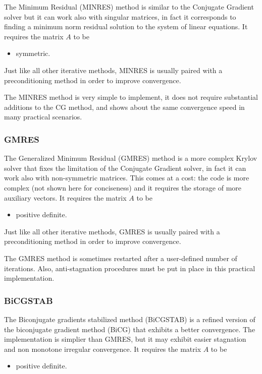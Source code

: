 \documentclass{digitaldynamics}
\def\matr#1{{#1}}
\begin{document}
The Minimum Residual (MINRES) method is similar to the Conjugate Gradient solver but it can work also with singular matrices, in fact it corresponds to finding a minimum norm residual solution to the system of linear equations.
It requires the matrix $\matr{A}$ to be 
\begin{itemize}
\item symmetric.
\end{itemize}

Just like all other iterative methods, MINRES is usually paired with a preconditioning method in order to improve convergence.

The MINRES method is very simple to implement, it does not require substantial additions to the CG method, and shows about the same convergence speed in many practical scenarios.


\subsubsection{GMRES}

The Generalized Minimum Residual (GMRES) method is a more complex Krylov solver that fixes the limitation of the Conjugate Gradient solver, in fact it can work also with non-symmetric matrices. This comes at a cost: the code is more complex (not shown here for conciseness) and it requires the storage of more auxiliary vectors.
It requires the matrix $\matr{A}$ to be 
\begin{itemize}
\item positive definite.
\end{itemize}

Just like all other iterative methods, GMRES is usually paired with a preconditioning method in order to improve convergence.

The GMRES method is sometimes restarted after a user-defined number of iterations. Also, anti-stagnation procedures must be put in place in this practical implementation.


\subsubsection{BiCGSTAB}

The Biconjugate gradients stabilized method (BiCGSTAB)  is a refined version of the biconjugate gradient method (BiCG) that exhibits a better convergence. The implementation is simplier than GMRES, but it may exhibit easier stagnation and non monotone irregular convergence.
It requires the matrix $\matr{A}$ to be 
\begin{itemize}
\item positive definite.
\end{itemize}
\end{document}
